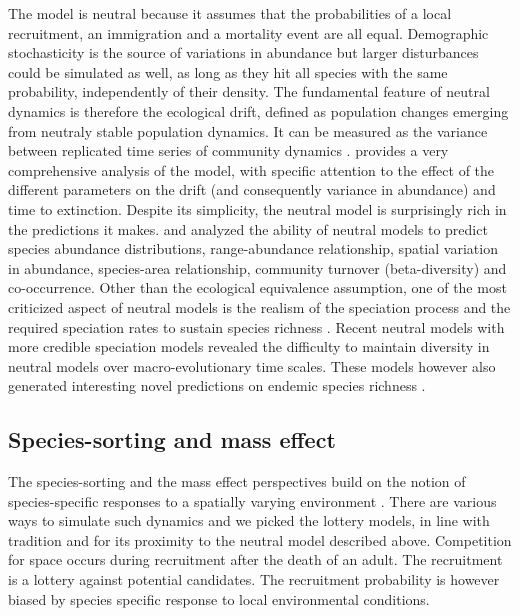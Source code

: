 \documentclass[12pt]{article}
\begin{document}
The model is neutral because it assumes that the probabilities of a local recruitment, an immigration and a mortality event are all equal. Demographic stochasticity is the source of variations in abundance but larger disturbances could be simulated as well, as long as they hit all species with the same probability, independently of their density. The fundamental feature of neutral dynamics is therefore the ecological drift, defined as population changes emerging from neutraly stable population dynamics. It can be measured as the variance between replicated time series of community dynamics \parencite{Gravel2011}. \textcite{Hubbell2001} provides a very comprehensive analysis of the model, with specific attention to the effect of the different parameters on the drift (and consequently variance in abundance) and time to extinction. Despite its simplicity, the neutral model is surprisingly rich in the predictions it makes. \textcite{Bell2001} and \textcite{Hubbell2001} analyzed the ability of neutral models to predict species abundance distributions, range-abundance relationship, spatial variation in abundance, species-area relationship, community turnover (beta-diversity) and co-occurrence. Other than the ecological equivalence assumption, one of the most criticized aspect of neutral models is the realism of the speciation process and the required speciation rates to sustain species richness \parencite{Ricklefs2003,Etienne2007}. Recent neutral models with more credible speciation models \parencite{Rosindell2009,Desjardins2012a} revealed the difficulty to maintain diversity in neutral models over macro-evolutionary time scales. These models however also generated interesting novel predictions on endemic species richness \parencite{Rosindell2011,Desjardins2012b}. 

\subsection*{Species-sorting and mass effect}

The species-sorting and the mass effect perspectives build on the notion of species-specific responses to a spatially varying environment \parencite{Leibold2004a}. There are various ways to simulate such dynamics and we picked the lottery models, in line with tradition \parencite{Mouquet2002} and for its proximity to the neutral model described above. Competition for space occurs during recruitment after the death of an adult. The recruitment is a lottery against potential candidates. The recruitment probability is however biased by species specific response to local environmental conditions. 
\end{document}
